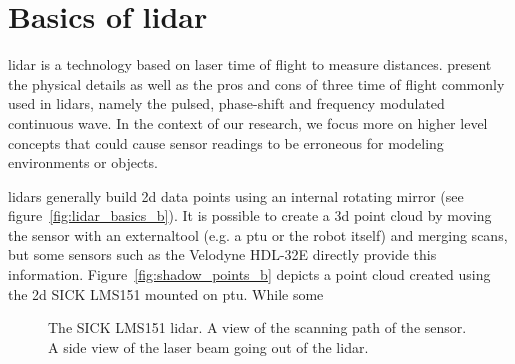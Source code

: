 \section{Basics of \gls{lidar}}
\label{sec:chap_lidar_basics}

\gls{lidar} is a technology based on laser time of flight to measure distances. \citet{lidar_basics} present the physical details as well as the pros and cons of three time of flight commonly used in \gls{lidar}s, namely the pulsed, phase-shift and frequency modulated continuous wave. In the context of our research, we focus more on higher level concepts that could cause sensor readings to be erroneous for modeling environments or objects. 

\gls{lidar}s generally build \gls{2d} data points using an internal rotating mirror (see figure~\ref{fig:lidar_basics_b}). It is possible to create a \gls{3d} point cloud by moving the sensor with an externaltool (e.g. a \gls{ptu} or the robot itself) and merging scans, but some sensors such as the Velodyne HDL-32E directly provide this information. Figure~\ref{fig:shadow_points_b} depicts a point cloud created using the \gls{2d} SICK LMS151 mounted on \gls{ptu}. While some

\begin{figure}[htpb]
    \centering
    \caption{\protect{} The SICK LMS151 \gls{lidar}. \protect{} A view of the scanning path of the sensor. \protect{} A side view of the laser beam going out of the \gls{lidar}.}
    \label{fig:lidar_basics}
\end{figure}

